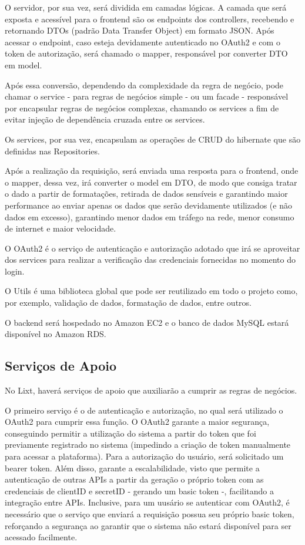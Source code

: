 O servidor, por sua vez, será dividida em camadas lógicas. A camada que será exposta e acessível para o frontend são os endpoints dos controllers, recebendo e retornando DTOs (padrão Data Transfer Object) em formato JSON. Após acessar o endpoint, caso esteja devidamente autenticado no OAuth2 e com o token de autorização, será chamado o mapper, responsável por converter DTO em model.

Após essa conversão, dependendo da complexidade da regra de negócio, pode chamar o service - para regras de negócios simple -  ou um facade - responsável por encapsular regras de negócios complexas, chamando os services a fim de evitar injeção de dependência cruzada entre os services. 

Os services, por sua vez, encapsulam as operações de CRUD do hibernate que são definidas nas Repositories.

Após a realização da requisição, será enviada uma resposta para o frontend, onde o mapper, dessa vez, irá converter o model em DTO, de modo que consiga tratar o dado a partir de formatações, retirada de dados sensíveis e garantindo maior performance ao enviar apenas os dados que serão devidamente utilizados (e não dados em excesso), garantindo menor dados em tráfego na rede, menor consumo de internet e maior velocidade.

O OAuth2 é o serviço de autenticação e autorização adotado que irá se aproveitar dos services para realizar a verificação das credenciais fornecidas no momento do login.

O Utils é uma biblioteca global que pode ser reutilizado em todo o projeto como, por exemplo, validação de dados, formatação de dados, entre outros.

O backend será hospedado no Amazon EC2 e o banco de dados MySQL estará disponível no Amazon RDS.

\subsection{Serviços de Apoio}

No Lixt, haverá serviços de apoio que auxiliarão a cumprir as regras de negócios. 

O primeiro serviço é o de autenticação e autorização, no qual será utilizado o OAuth2 para cumprir essa função. O OAuth2 garante a maior segurança, conseguindo permitir a utilização do sistema a partir do token que foi previamente registrado no sistema (impedindo a criação de token manualmente para acessar a plataforma). Para a autorização do usuário, será solicitado um bearer token. Além disso, garante a escalabilidade, visto que permite a autenticação de outras APIs a partir da geração o próprio token com as credenciais de clientID e secretID - gerando um basic token -, facilitando a integração entre APIs. Inclusive, para um uusário se autenticar com OAuth2, é necessário que o serviço que enviará a requisição possua seu próprio basic token, reforçando a segurança ao garantir que o sistema não estará disponível para ser acessado facilmente.

